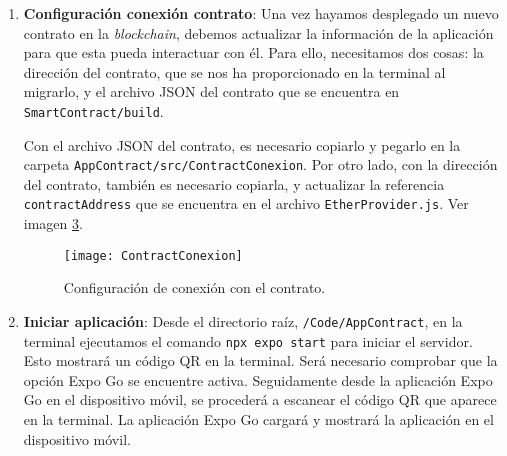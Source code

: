 \begin{enumerate}
\begin{figure}[h]
	\centering
	\texttt{[image: TruffleCompile]}
	\caption[Compilar smart contract]{Compilar \textit{smart contract} usando Truffle.}
	\label{fig:TruffleCompile}
\end{figure}	
	
	\begin{itemize}
	\item \textbf{Migrar}: Finalmente, el último paso es desplegar el contrato en la \textit{blockchain}.
	Esto se realiza desde el directorio \texttt{SmartContract} usando el comando \texttt{truffle migrate}.
	Este comando desplegará los contratos inteligentes en la red configurada, en este caso Ganache y generará
	los archivos necesarios en el directorio \texttt{build/contracts}.
	Tras una correcta migración, se mostrará la dirección del contrato, la cuenta del creador, el costo total
	del despliegue, etcétera. 	
Ver imagen \ref{fig:TruffleMigrate}.
	\end{itemize}
	
\begin{figure}[h]
	\centering
	\texttt{[image: TruffleMigrate]}
	\caption[Despliegue smart contract]{Despliegue del contrato en la red de Ganache usando Truffle.}
	\label{fig:TruffleMigrate}
\end{figure}	
	
	
\item \textbf{Configuración conexión contrato}: Una vez hayamos desplegado un nuevo contrato en la \textit{blockchain}, debemos actualizar la información de la aplicación para que esta pueda interactuar con él.
Para ello, necesitamos dos cosas: la dirección del contrato, que se nos ha proporcionado en la terminal al migrarlo, y el archivo JSON del contrato que se encuentra en \texttt{SmartContract/build}.
	
Con el archivo JSON del contrato, es necesario copiarlo y pegarlo en la carpeta \texttt{AppContract/src/ContractConexion}. 
Por otro lado, con la dirección del contrato, también es necesario copiarla, y actualizar la referencia \texttt{contractAddress} que se encuentra en el archivo \texttt{EtherProvider.js}.
Ver imagen \ref{fig:ContractConexion}.

\begin{figure}[h]
	\centering
	\texttt{[image: ContractConexion]}
	\caption[Conexión con el contrato]{Configuración de conexión con el contrato.}
	\label{fig:ContractConexion}
\end{figure}	

\item \textbf{Iniciar aplicación}: Desde el directorio raíz, \texttt{/Code/AppContract}, en la terminal ejecutamos el comando \texttt{npx expo start} para iniciar el servidor. Esto mostrará un código QR en la terminal. Será necesario comprobar que la opción Expo Go se encuentre activa.
Seguidamente desde la aplicación Expo Go en el dispositivo móvil, se procederá a escanear el código QR que aparece en la terminal.
La aplicación Expo Go cargará y mostrará la aplicación en el dispositivo móvil.

\end{enumerate}

